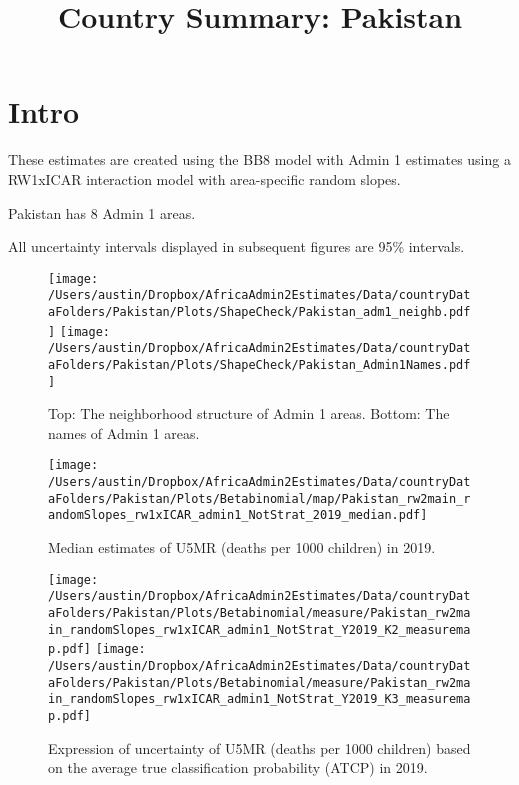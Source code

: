 \documentclass[]{article}
\title{Country Summary: Pakistan}
\author{}
\date{\vspace{-2.5em}}
\begin{document}
\maketitle

{
\setcounter{tocdepth}{2}
\tableofcontents
}
\hypertarget{intro}{%
\section{Intro}\label{intro}}

These estimates are created using the BB8 model with Admin 1 estimates
using a RW1xICAR interaction model with area-specific random slopes.

\par

Pakistan has 8 Admin 1 areas.

\par

All uncertainty intervals displayed in subsequent figures are 95\%
intervals.

\begin{figure}
\centering
\texttt{[image: /Users/austin/Dropbox/AfricaAdmin2Estimates/Data/countryDataFolders/Pakistan/Plots/ShapeCheck/Pakistan\_adm1\_neighb.pdf]}
\texttt{[image: /Users/austin/Dropbox/AfricaAdmin2Estimates/Data/countryDataFolders/Pakistan/Plots/ShapeCheck/Pakistan\_Admin1Names.pdf]}
\caption{Top: The neighborhood structure of Admin 1 areas. Bottom: The names of Admin 1 areas.}
\end{figure}
\clearpage

\begin{figure}
\centering
\texttt{[image: /Users/austin/Dropbox/AfricaAdmin2Estimates/Data/countryDataFolders/Pakistan/Plots/Betabinomial/map/Pakistan\_rw2main\_randomSlopes\_rw1xICAR\_admin1\_NotStrat\_2019\_median.pdf]}
\caption{Median estimates of U5MR (deaths per 1000 children) in 2019.}
\end{figure}
\begin{figure}
\centering
\texttt{[image: /Users/austin/Dropbox/AfricaAdmin2Estimates/Data/countryDataFolders/Pakistan/Plots/Betabinomial/measure/Pakistan\_rw2main\_randomSlopes\_rw1xICAR\_admin1\_NotStrat\_Y2019\_K2\_measuremap.pdf]}
\texttt{[image: /Users/austin/Dropbox/AfricaAdmin2Estimates/Data/countryDataFolders/Pakistan/Plots/Betabinomial/measure/Pakistan\_rw2main\_randomSlopes\_rw1xICAR\_admin1\_NotStrat\_Y2019\_K3\_measuremap.pdf]}
\caption{Expression of uncertainty of U5MR (deaths per 1000 children) based on the average true classification probability (ATCP) in 2019.}
\end{figure}
\clearpage
\end{document}
